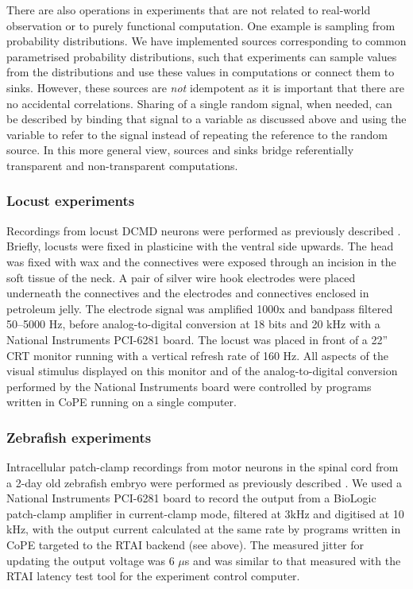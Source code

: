 There are also operations in experiments that are not related to real-world
observation or to purely functional computation. One example is sampling from
probability distributions. We have implemented sources corresponding to common
parametrised probability distributions, such that experiments can sample
values from the distributions and use these values in computations or
connect them to sinks. However, these sources are \emph{not} idempotent as it
is important that there are no accidental correlations. Sharing of a single random
signal, when needed, can  be described by binding that signal to a
variable as discussed above and using the variable to refer to the signal
instead of repeating the reference to the random source. In this more general
view, sources and sinks bridge referentially transparent and non-transparent
computations.

\subsubsection*{Locust experiments}

Recordings from locust DCMD neurons were performed as previously
described \cite{Matheson2004}. Briefly, locusts were fixed in
plasticine with the ventral side upwards. The head was fixed with wax
and the connectives were exposed through an
incision in the soft tissue of the neck. A pair of silver wire hook
electrodes were placed underneath the connectives and the electrodes
and connectives enclosed in petroleum jelly. The electrode signal was
amplified 1000x and bandpass filtered 50--5000 Hz, before
analog-to-digital conversion at 18 bits and 20 kHz with a National
Instruments PCI-6281 board. The locust was placed in front of a 22''
CRT monitor running with a vertical refresh rate of 160 Hz. All
aspects of the visual stimulus displayed on this monitor and of
the analog-to-digital conversion performed by the National Instruments
board were controlled by programs written in 
CoPE running on a single computer.

\subsubsection*{Zebrafish experiments}

Intracellular patch-clamp recordings from motor neurons in the spinal
cord from a 2-day old zebrafish embryo were performed as previously
described \cite{McDearmid2006}. We used a National Instruments PCI-6281
board to
record the output from a BioLogic patch-clamp amplifier in
current-clamp mode, filtered at 3kHz and digitised at 10 kHz, with the
output current calculated at the same rate by programs written in
CoPE targeted to the RTAI backend (see
above). The measured jitter for updating the output voltage was 6
$\mu$s and was similar to that measured with the RTAI latency test
tool for the experiment control computer.

